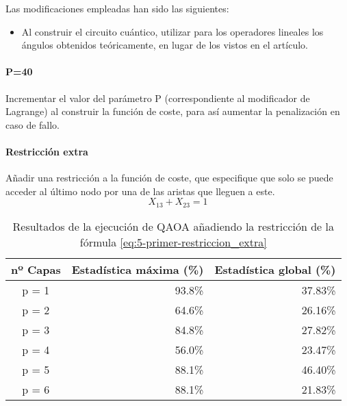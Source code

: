 \documentclass{article}
\begin{document}
Las modificaciones empleadas han sido las siguientes:
\begin{itemize}
\item Al construir el circuito cuántico, utilizar para los operadores lineales los ángulos obtenidos teóricamente, en lugar de los vistos en el artículo.
\end{itemize}

\paragraph{P=40}
Incrementar el valor del parámetro P (correspondiente al modificador de Lagrange)
al construir la función de coste, para así aumentar la penalización en caso de fallo.

\paragraph{Restricción extra}
Añadir una restricción a la función de coste, que especifique que solo se puede acceder al último nodo por una de las aristas que lleguen a este.
\begin{equation}
  \label{eq:5-primer-restriccion_extra}
  X_{13} + X_{23} = 1
\end{equation}

\begin{table}[htbp]
  \centering
  \begin{tabular}{|c|r|r|}
    \hline
    \textbf{nº Capas} & \textbf{Estadística máxima (\%)} & \textbf{Estadística global (\%)} \\ \hline
    p = 1 & 93.8\% & 37.83\% \\ \hline
    p = 2 & 64.6\% & 26.16\% \\ \hline
    p = 3 & 84.8\% & 27.82\% \\ \hline
    p = 4 & 56.0\% & 23.47\% \\ \hline
    p = 5 & 88.1\% & 46.40\% \\ \hline
    p = 6 & 88.1\% & 21.83\% \\ \hline
  \end{tabular}
  \caption{Resultados de la ejecución de QAOA añadiendo la restricción de la fórmula \ref{eq:5-primer-restriccion_extra}}
  \label{tab:5-primer-restriccion_extra-aer_estadisticas}
\end{table}
\end{document}
